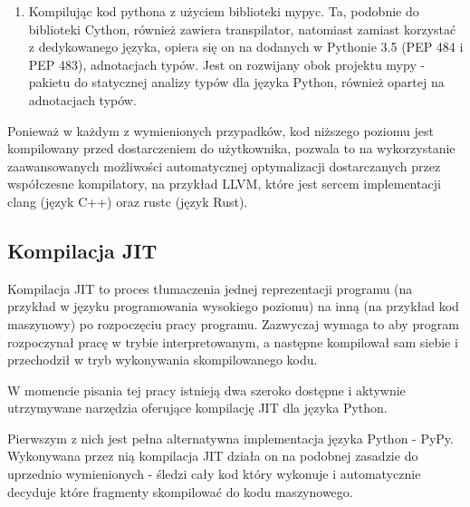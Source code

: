 \documentclass[11pt, a4paper]{article}
\begin{document}
\begin{sloppypar}
\begin{enumerate}
      \item Kompilując kod pythona z użyciem biblioteki mypyc\cite{mypyc}. Ta, podobnie
        do biblioteki Cython, również zawiera transpilator, natomiast zamiast korzystać
        z dedykowanego języka, opiera się on na dodanych w Pythonie 3.5\cite{Python_3_5}
        (PEP 484\cite{PEP_484} i PEP 483\cite{PEP_483}), adnotacjach typów. Jest on
        rozwijany obok projektu mypy - pakietu do statycznej analizy typów dla języka
        Python, również opartej na adnotacjach typów\cite{mypy}.
    \end{enumerate}

    Ponieważ w każdym z wymienionych przypadków, kod niższego poziomu jest kompilowany przed
    dostarczeniem do użytkownika, pozwala to na wykorzystanie zaawansowanych możliwości
    automatycznej optymalizacji dostarczanych przez współczesne kompilatory, na przykład
    LLVM, które jest sercem implementacji clang (język C++) oraz rustc (język Rust).

    \subsection{Kompilacja JIT}
    Kompilacja JIT to proces tłumaczenia jednej reprezentacji programu (na przykład w języku
    programowania wysokiego poziomu) na inną (na przykład kod maszynowy) po rozpoczęciu
    pracy programu. Zazwyczaj wymaga to aby program rozpoczynał pracę w trybie interpretowanym,
    a następne kompilował sam siebie i przechodził w tryb wykonywania skompilowanego
    kodu.

    W momencie pisania tej pracy istnieją dwa szeroko dostępne i aktywnie utrzymywane
    narzędzia oferujące kompilację JIT dla języka Python.

    Pierwszym z nich jest pełna alternatywna implementacja języka Python - PyPy\cite{PyPy_Home_Page}.
    Wykonywana przez nią kompilacja JIT działa on na podobnej zasadzie do uprzednio
    wymienionych - śledzi cały kod który wykonuje i automatycznie decyduje które
    fragmenty skompilować do kodu maszynowego\cite{PyPy_JIT}.



\end{sloppypar}
\end{document}

